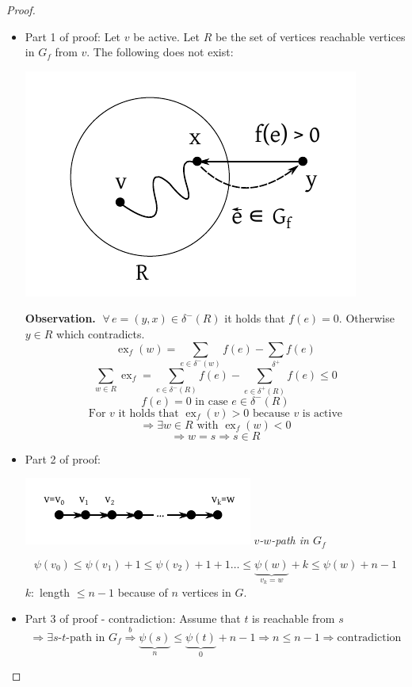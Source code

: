 \documentclass{article}
\newcommand{\gath}[2]{$#1$-$#2$-path} %
\newcommand{\fall}{\;\forall\,}
\begin{document}
\begin{proof}
  \begin{itemize}
    \item Part 1 of proof:
      Let $v$ be active. Let $R$ be the set of vertices reachable vertices in $G_f$ from $v$.
      The following does not exist:
      \begin{center}
        \includegraphics{img/lemma-4_9-proof-a.pdf}
      \end{center}

      \textbf{Observation.} $\fall e = (y, x) \in \delta^-(R)$ it holds that $f(e) = 0$. Otherwise $y \in R$ which contradicts.
      \[ \operatorname{ex}_f(w) = \sum_{e \in \delta^-(w)} f(e) - \sum_{\delta^+} f(e) \]
      \[ \sum_{w \in R} \operatorname{ex}_f = \sum_{e \in \delta^-(R)} f(e) - \sum_{e \in \delta^+(R)} f(e) \leq 0 \]
      \[ f(e) = 0 \text{ in case } e \in \delta^-(R) \]
      \[ \text{For $v$ it holds that } \operatorname{ex}_f(v) > 0 \text{ because $v$ is active} \]
      \[ \Rightarrow \exists w \in R \text{ with } \operatorname{ex}_f(w) < 0 \]
      \[ \Rightarrow w = s \Rightarrow s \in R \]
    \item Part 2 of proof:
      \begin{center}
        \includegraphics{img/lemma-4_9-proof-b.pdf}
        \textit{\gath vw in $G_f$}
      \end{center}
      \[
        \psi(v_0) \leq \psi(v_1) + 1
          \leq \psi(v_2) + 1 + 1 \dots
          \leq \underbrace{\psi(w)}_{v_k = w} + k
          \leq \psi(w) + n - 1
      \]
      $k:$ length $\leq n-1$ because of $n$ vertices in $G$.
    \item Part 3 of proof - contradiction: Assume that $t$ is reachable from $s$
      \[
        \Rightarrow \exists \text{\gath st in } G_f
        \stackrel{b}{\Rightarrow} \underbrace{\psi(s)}_{n} \leq \underbrace{\psi(t)}_{0} + n - 1
        \Rightarrow n \leq n - 1
        \Rightarrow \text{contradiction}
      \]
  \end{itemize}
\end{proof}
\end{document}
